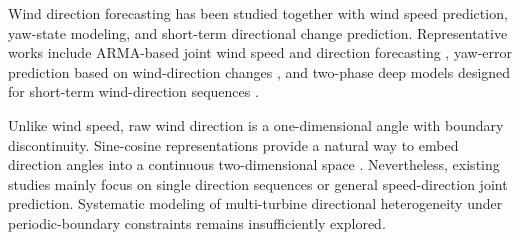 Wind direction forecasting has been studied together with wind speed prediction, yaw-state modeling, and short-term directional change prediction. Representative works include ARMA-based joint wind speed and direction forecasting \cite{Erdem2011ARMATupleWindSpeedDirection}, yaw-error prediction based on wind-direction changes \cite{Ouyang2017PredictiveYawError}, and two-phase deep models designed for short-term wind-direction sequences \cite{Tang2021TwoPhaseWindDirection}.

Unlike wind speed, raw wind direction is a one-dimensional angle with boundary discontinuity. Sine-cosine representations provide a natural way to embed direction angles into a continuous two-dimensional space \cite{Erdem2011ARMATupleWindSpeedDirection,Ouyang2017PredictiveYawError}. Nevertheless, existing studies mainly focus on single direction sequences or general speed-direction joint prediction. Systematic modeling of multi-turbine directional heterogeneity under periodic-boundary constraints remains insufficiently explored.
